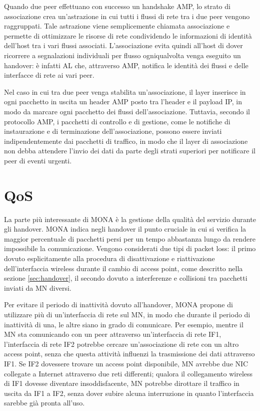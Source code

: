 \documentclass[12pt,a4paper,openright,twoside]{book}
\begin{document}
Quando due peer effettuano con successo un handshake AMP, lo strato di
associazione crea un'astrazione in cui tutti i flussi di rete tra i
due peer vengono raggruppati. Tale astrazione viene semplicemente
chiamata associazione e permette di ottimizzare le risorse di rete
condividendo le informazioni di identità dell'host tra i vari flussi
associati. L'associazione evita quindi all'host di dover ricorrere a
segnalazioni individuali per flusso ogniqualvolta venga eseguito un
handover: è infatti AL che, attraverso AMP, notifica le identità dei
flussi e delle interfacce di rete ai vari peer.

Nel caso in cui tra due peer venga stabilita un'associazione, il layer
inserisce in ogni pacchetto in uscita un header AMP posto tra l'header
e il payload IP, in modo da marcare ogni pacchetto dei flussi
dell'associazione. Tuttavia, secondo il protocollo AMP, i pacchetti di
controllo e di gestione, come le notifiche di instaurazione e di
terminazione dell'associazione, possono essere inviati
indipendentemente dai pacchetti di traffico, in modo che il layer di
associazione non debba attendere l'invio dei dati da parte degli
strati superiori per notificare il peer di eventi urgenti.

\section{QoS}
\label{sec:mona:qos}

La parte più interessante di MONA è la gestione della qualità del
servizio durante gli handover. MONA indica negli handover il punto
cruciale in cui si verifica la maggior percentuale di pacchetti persi
per un tempo abbastanza lungo da rendere impossibile la
comunicazione. Vengono considerati due tipi di packet loss: il primo
dovuto esplicitamente alla procedura di disattivazione e riattivazione
dell'interfaccia wireless durante il cambio di access point, come
descritto nella sezione \ref{sec:handover}, il secondo dovuto a
interferenze e collisioni tra pacchetti inviati da MN diversi.

Per evitare il periodo di inattività dovuto all'handover, MONA propone
di utilizzare più di un'interfaccia di rete sul MN, in modo che
durante il periodo di inattività di una, le altre siano in grado di
comunicare. Per esempio, mentre il MN sta comunicando con un peer
attraverso un'interfaccia di rete IF1, l'interfaccia di rete IF2
potrebbe cercare un'associazione di rete con un altro access point,
senza che questa attività influenzi la trasmissione dei dati
attraverso IF1. Se IF2 dovessere trovare un access point disponibile,
MN avrebbe due NIC collegate a Internet attraverso due reti
differenti; qualora il collegamento wireless di IF1 dovesse diventare
insoddisfacente, MN potrebbe dirottare il traffico in uscita da IF1 a
IF2, senza dover subire alcuna interruzione in quanto l'interfaccia
sarebbe già pronta all'uso.
\end{document}
